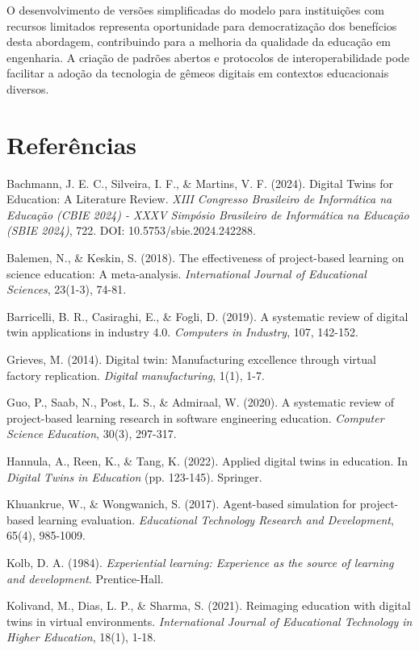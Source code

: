 \documentclass[english, spanish, brazilian]{modelo_dt}
\begin{document}
O desenvolvimento de versões simplificadas do modelo para instituições com
recursos limitados representa oportunidade para democratização dos benefícios
desta abordagem, contribuindo para a melhoria da qualidade da educação em
engenharia\@. A criação de padrões abertos e protocolos de interoperabilidade
pode facilitar a adoção da tecnologia de gêmeos digitais em contextos
educacionais diversos\@.

\section*{Referências}

\noindent
Bachmann, J. E. C., Silveira, I. F., \& Martins, V. F. (2024). Digital Twins for Education: A Literature Review. \textit{XIII Congresso Brasileiro de Informática na Educação (CBIE 2024) - XXXV Simpósio Brasileiro de Informática na Educação (SBIE 2024)}, 722. DOI: 10.5753/sbie.2024.242288.

\noindent
Balemen, N., \& Keskin, S. (2018). The effectiveness of project-based learning on science education: A meta-analysis. \textit{International Journal of Educational Sciences}, 23(1-3), 74-81.

\noindent
Barricelli, B. R., Casiraghi, E., \& Fogli, D. (2019). A systematic review of digital twin applications in industry 4.0. \textit{Computers in Industry}, 107, 142-152.

\noindent
Grieves, M. (2014). Digital twin: Manufacturing excellence through virtual factory replication. \textit{Digital manufacturing}, 1(1), 1-7.

\noindent
Guo, P., Saab, N., Post, L. S., \& Admiraal, W. (2020). A systematic review of project-based learning research in software engineering education. \textit{Computer Science Education}, 30(3), 297-317.

\noindent
Hannula, A., Reen, K., \& Tang, K. (2022). Applied digital twins in education. In \textit{Digital Twins in Education} (pp. 123-145). Springer.

\noindent
Khuankrue, W., \& Wongwanich, S. (2017). Agent-based simulation for project-based learning evaluation. \textit{Educational Technology Research and Development}, 65(4), 985-1009.

\noindent
Kolb, D. A. (1984). \textit{Experiential learning: Experience as the source of learning and development}. Prentice-Hall.

\noindent
Kolivand, M., Dias, L. P., \& Sharma, S. (2021). Reimaging education with digital twins in virtual environments. \textit{International Journal of Educational Technology in Higher Education}, 18(1), 1-18.
\end{document}
